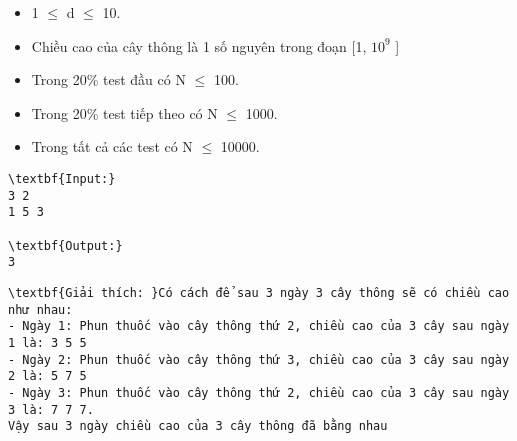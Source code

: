 \begin{itemize}
	\item 1  $\le$  d  $\le$  10.
	\item Chiều cao của cây thông là 1 số nguyên trong đoạn [1, $10^{9}$ ]
	\item Trong 20\% test đầu có N  $\le$  100.
	\item Trong 20\% test tiếp theo có N  $\le$  1000.
	\item Trong tất cả các test có N  $\le$  10000.
\end{itemize}
\begin{verbatim}
\textbf{Input:}
3 2
1 5 3

\textbf{Output:}
3\end{verbatim}
\begin{verbatim}
\textbf{Giải thích: }Có cách để sau 3 ngày 3 cây thông sẽ có chiều cao như nhau:
- Ngày 1: Phun thuốc vào cây thông thứ 2, chiều cao của 3 cây sau ngày 1 là: 3 5 5
- Ngày 2: Phun thuốc vào cây thông thứ 3, chiều cao của 3 cây sau ngày 2 là: 5 7 5
- Ngày 3: Phun thuốc vào cây thông thứ 2, chiều cao của 3 cây sau ngày 3 là: 7 7 7.
Vậy sau 3 ngày chiều cao của 3 cây thông đã bằng nhau\end{verbatim}